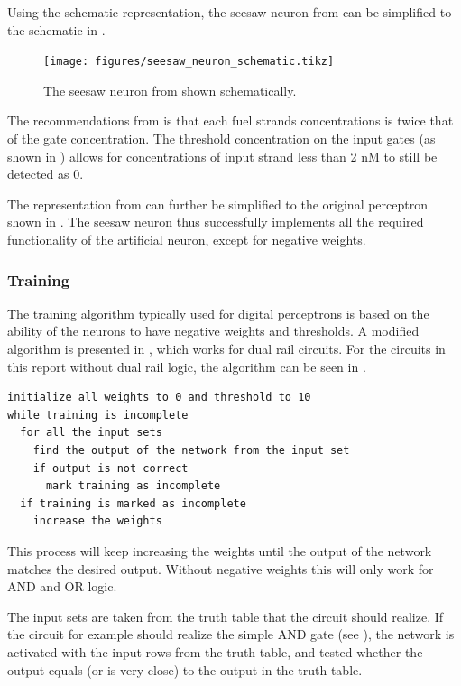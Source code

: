 Using the schematic representation, the seesaw neuron from  can be simplified to the schematic in .

\begin{figure}[h]
  \texttt{[image: figures/seesaw\_neuron\_schematic.tikz]}
  \caption{The seesaw neuron from  shown schematically.}
  \label{seesaw_neuron_schematic}
\end{figure}

The recommendations from \cite{Qian2011} is that each fuel strands concentrations is twice that of the gate concentration. The threshold concentration on the input gates (as shown in ) allows for concentrations of input strand less than 2 nM to still be detected as 0.

The representation from  can further be simplified to the original perceptron shown in . The seesaw neuron thus successfully implements all the required functionality of the artificial neuron, except for negative weights.

\subsubsection{Training}
The training algorithm typically used for digital perceptrons is based on the ability of the neurons to have negative weights and thresholds. A modified algorithm is presented in \cite{Qian2011}, which works for dual rail circuits. For the circuits in this report without dual rail logic, the algorithm can be seen in .

\begin{lstlisting}[float,floatplacement=h,caption=Pseudocode for the seesaw perceptron training algorithm, label=codetraining]
initialize all weights to 0 and threshold to 10
while training is incomplete
  for all the input sets
    find the output of the network from the input set
    if output is not correct
      mark training as incomplete
  if training is marked as incomplete
    increase the weights
\end{lstlisting}

This process will keep increasing the weights until the output of the network matches the desired output. Without negative weights this will only work for AND and OR logic.

The input sets are taken from the truth table that the circuit should realize. If the circuit for example should realize the simple AND gate (see ), the network is activated with the input rows from the truth table, and tested whether the output equals (or is very close) to the output in the truth table.

